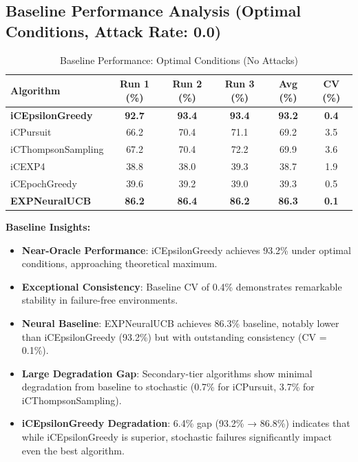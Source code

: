 \documentclass[12pt,a4paper]{article}
\newcommand{\primarytext}[1]{\textcolor{primaryblue}{\textbf{#1}}}
\newcommand{\secondarytext}[1]{\textcolor{secondaryblue}{\textbf{#1}}}
\newcommand{\warning}[1]{\textcolor{warningred}{\textbf{#1}}}
\newcommand{\legacy}[1]{\textcolor{legacycolor}{\textbf{#1}}}
\begin{document}
\subsection{Baseline Performance Analysis (Optimal Conditions, Attack Rate: 0.0)}

\begin{table}[H]
\centering
\caption{Baseline Performance: Optimal Conditions (No Attacks)}
\label{tab:baseline-performance}
\begin{tabular}{@{}lccccc@{}}
\toprule
\textbf{Algorithm} & \textbf{Run 1 (\%)} & \textbf{Run 2 (\%)} & \textbf{Run 3 (\%)} & \textbf{Avg (\%)} & \textbf{CV (\%)} \\
\midrule
\primarytext{iCEpsilonGreedy}   & \primarytext{92.7} & \primarytext{93.4} & \primarytext{93.4} & \primarytext{93.2} & \primarytext{0.4} \\
iCPursuit                       & 66.2 & 70.4 & 71.1 & 69.2 & 3.5 \\
iCThompsonSampling              & 67.2 & 70.4 & 72.2 & 69.9 & 3.6 \\
iCEXP4                          & 38.8 & 38.0 & 39.3 & 38.7 & 1.9 \\
iCEpochGreedy                   & 39.6 & 39.2 & 39.0 & 39.3 & 0.5 \\
\legacy{EXPNeuralUCB}           & \legacy{86.2} & \legacy{86.4} & \legacy{86.2} & \legacy{86.3} & \legacy{0.1} \\
\bottomrule
\end{tabular}
\end{table}

\textbf{Baseline Insights:}
\begin{itemize}
\item \primarytext{Near-Oracle Performance}: iCEpsilonGreedy achieves 93.2\% under optimal conditions, approaching theoretical maximum.
\item \primarytext{Exceptional Consistency}: Baseline CV of 0.4\% demonstrates remarkable stability in failure-free environments.
\item \legacy{Neural Baseline}: EXPNeuralUCB achieves 86.3\% baseline, notably lower than iCEpsilonGreedy (93.2\%) but with outstanding consistency (CV = 0.1\%).
\item \secondarytext{Large Degradation Gap}: Secondary-tier algorithms show minimal degradation from baseline to stochastic (0.7\% for iCPursuit, 3.7\% for iCThompsonSampling).
\item \warning{iCEpsilonGreedy Degradation}: 6.4\% gap (93.2\% → 86.8\%) indicates that while iCEpsilonGreedy is superior, stochastic failures significantly impact even the best algorithm.
\end{itemize}
\end{document}

